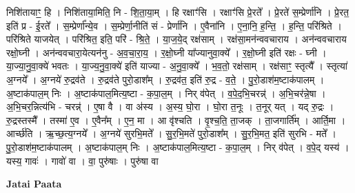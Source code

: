\documentclass[17pt]{extarticle}
\begin{document}
निशि॑तायाꣳ॒॒ हि । निशि॑ताया॒मिति॒ नि - शि॒ता॒या॒म् । हि रक्षाꣳ॑सि । रक्षाꣳ॑सि प्रे॒रते᳚ । प्रे॒रते॑ स॒म्प्रेर्णा॑नि । प्रे॒रत॒ इति॑ प्र - ई॒रते᳚ । स॒म्प्रेर्णा᳚न्ये॒व । स॒म्प्रेर्णा॒नीति॑ सं - प्रेर्णा॑नि । ए॒वैना॑नि । ए॒ना॒नि॒ ह॒न्ति॒ । ह॒न्ति॒ परि॑श्रिते । परि॑श्रिते याजयेत् । परि॑श्रित॒ इति॒ परि॑ - श्रि॒ते॒ । या॒ज॒ये॒द् रक्ष॑साम् । रक्ष॑सा॒मन॑न्ववचाराय । अन॑न्ववचाराय रक्षो॒घ्नी । अन॑न्ववचारा॒येत्यन॑नु - अ॒व॒चा॒रा॒य॒ । र॒क्षो॒घ्नी या᳚ज्यानुवा॒क्ये᳚ । र॒क्षो॒घ्नी इति॑ रक्षः - घ्नी । या॒ज्या॒नु॒वा॒क्ये॑ भवतः । या॒ज्य॒नु॒वा॒क्ये॑ इति॑ याज्या - अ॒नु॒वा॒क्ये᳚ । भ॒व॒तो॒ रक्ष॑साम् । रक्ष॑साꣳ॒॒ स्तृत्यै᳚ । स्तृत्या॑ अ॒ग्नये᳚ । अ॒ग्नये॑ रु॒द्रव॑ते । रु॒द्रव॑ते पुरो॒डाश᳚म् । रु॒द्रव॑त॒ इति॑ रु॒द्र - व॒ते॒ । पु॒रो॒डाश॑म॒ष्टाक॑पालम् । अ॒ष्टाक॑पाल॒म् निः । अ॒ष्टाक॑पाल॒मित्य॒ष्टा - क॒पा॒ल॒म् । निर् व॑पेत् । व॒पे॒द॒भि॒चरन्न्॑ । अ॒भि॒चर॑न्ने॒षा । अ॒भि॒चर॒न्नित्य॑भि - चरन्न्॑ । ए॒षा वै । वा अ॑स्य । अ॒स्य॒ घो॒रा । घो॒रा त॒नूः । त॒नूर् यत् । यद् रु॒द्रः । रु॒द्रस्तस्मै᳚ । तस्मा॑ ए॒व । ए॒वैन᳚म् । ए॒न॒ मा । आ वृ॑श्चति । वृ॒श्च॒ति॒ ता॒जक् । ता॒जगार्ति᳚म् । आर्ति॒मा । आर्च्छ॑ति । ऋ॒च्छ॒त्य॒ग्नये᳚ । अ॒ग्नये॑ सुरभि॒मते᳚ । सु॒र॒भि॒मते॑ पुरो॒डाश᳚म् । सु॒र॒भि॒मत॒ इति॑ सुरभि - मते᳚ । पु॒रो॒डाश॑म॒ष्टाक॑पालम् । अ॒ष्टाक॑पाल॒म् निः । अ॒ष्टाक॑पाल॒मित्य॒ष्टा - क॒पा॒ल॒म् । निर् व॑पेत् । व॒पे॒द् यस्य॑ । यस्य॒ गावः॑ । गावो॑ वा । वा॒ पुरु॑षाः । पुरु॑षा वा \newline

\textbf{Jatai Paata} \newline
\end{document}
